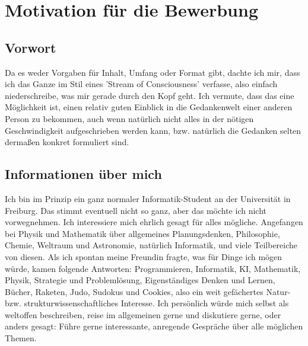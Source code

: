 \documentclass{scrartcl}
\begin{document}
\section*{Motivation für die Bewerbung}



\subsection*{Vorwort}

Da es weder Vorgaben für Inhalt, Umfang oder Format gibt, dachte ich mir, dass ich das Ganze
im Stil eines 'Stream of Consciousness' verfasse, also einfach niederschreibe, was mir gerade
durch den Kopf geht. Ich vermute, dass das eine Möglichkeit ist, einen relativ guten Einblick
in die Gedankenwelt einer anderen Person zu bekommen, auch wenn natürlich nicht alles in der
nötigen Geschwindigkeit aufgeschrieben werden kann, bzw. natürlich die Gedanken selten dermaßen
konkret formuliert sind.


\subsection*{Informationen über mich}

Ich bin im Prinzip ein ganz normaler Informatik-Student an der Universität in Freiburg. Das
stimmt eventuell nicht so ganz, aber das möchte ich nicht vorwegnehmen. Ich interessiere mich
ehrlich gesagt für alles mögliche. Angefangen bei Physik und Mathematik über allgemeines
Planungsdenken, Philosophie, Chemie, Weltraum und Astronomie, natürlich Informatik, und viele
Teilbereiche von diesen.
Als ich spontan meine Freundin fragte, was für Dinge ich mögen würde, kamen folgende Antworten:
Programmieren, Informatik, KI, Mathematik, Physik, Strategie und Problemlösung,
Eigenständiges Denken und Lernen, Bücher, Raketen, Judo, Sudokus und Cookies, also ein weit
gefächertes Natur- bzw. strukturwissenschaftliches Interesse.
Ich persönlich würde mich selbst als weltoffen beschreiben, reise im allgemeinen gerne
und diskutiere gerne, oder anders gesagt: Führe gerne interessante, anregende Gespräche über
alle möglichen Themen.
\end{document}
